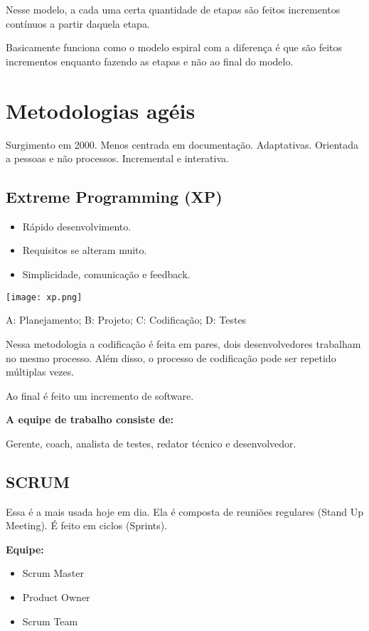 \documentclass{article}
\begin{document}
Nesse modelo, a cada uma certa quantidade de etapas
são feitos incrementos contínuos a partir daquela etapa.

Basicamente funciona como o modelo espiral com a diferença
é que são feitos incrementos enquanto fazendo as etapas e não ao final do modelo.

\section{Metodologias agéis}
Surgimento em 2000. Menos centrada
em documentação. Adaptativas. Orientada a pessoas e não processos.
Incremental e interativa.

\subsection*{Extreme Programming (XP)}

\begin{itemize}
    \item Rápido desenvolvimento.
    \item Requisitos se alteram muito.
    \item Simplicidade, comunicação e feedback.
\end{itemize}

\begin{center}
    \texttt{[image: xp.png]}
\end{center}

A: Planejamento;
B: Projeto;
C: Codificação;
D: Testes

Nessa metodologia a codificação é feita em pares,
dois desenvolvedores trabalham no mesmo processo.
Além disso, o processo de codificação pode ser repetido
múltiplas vezes.

Ao final é feito um incremento de software.

\noindent
\textbf{A equipe de trabalho consiste de:}

Gerente, coach, analista de testes, redator técnico e 
desenvolvedor.

\subsection*{SCRUM}
Essa é a mais usada hoje em dia.
Ela é composta de reuniões regulares (Stand Up Meeting).
É feito em ciclos (Sprints).

\noindent
\textbf{Equipe:}
\begin{itemize}
    \item Scrum Master
    \item Product Owner
    \item Scrum Team
\end{itemize}
\end{document}
